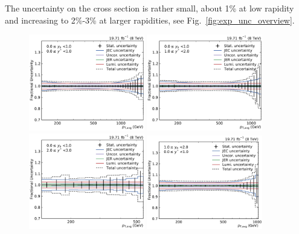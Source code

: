 The uncertainty on the cross section is rather small, about 1\% at low rapidity
and increasing to 2\%-3\% at larger rapidities, see
Fig.~\ref{fig:exp_unc_overview}.


\begin{figure}[htbp]
    \centering
    \includegraphics[width=0.45\textwidth]{figures/measurement/exp_unc_overview_yb0ys0.pdf}\hfill
    \includegraphics[width=0.45\textwidth]{figures/measurement/exp_unc_overview_yb0ys1.pdf}
    \includegraphics[width=0.45\textwidth]{figures/measurement/exp_unc_overview_yb0ys2.pdf}\hfill
    \includegraphics[width=0.45\textwidth]{figures/measurement/exp_unc_overview_yb1ys0.pdf}

\end{figure}
